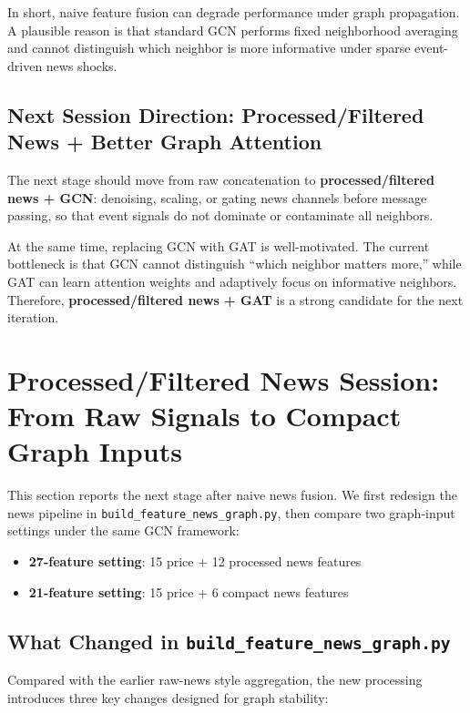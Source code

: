 In short, naive feature fusion can degrade performance under graph propagation. A plausible reason is that standard GCN performs fixed neighborhood averaging and cannot distinguish which neighbor is more informative under sparse event-driven news shocks.

\subsection{Next Session Direction: Processed/Filtered News + Better Graph Attention}

The next stage should move from raw concatenation to \textbf{processed/filtered news + GCN}: denoising, scaling, or gating news channels before message passing, so that event signals do not dominate or contaminate all neighbors.

At the same time, replacing GCN with GAT is well-motivated. The current bottleneck is that GCN cannot distinguish ``which neighbor matters more,'' while GAT can learn attention weights and adaptively focus on informative neighbors. Therefore, \textbf{processed/filtered news + GAT} is a strong candidate for the next iteration.

\section{Processed/Filtered News Session: From Raw Signals to Compact Graph Inputs}

This section reports the next stage after naive news fusion. We first redesign the news pipeline in \texttt{build\_feature\_news\_graph.py}, then compare two graph-input settings under the same GCN framework:
\begin{itemize}
\item \textbf{27-feature setting}: 15 price + 12 processed news features
\item \textbf{21-feature setting}: 15 price + 6 compact news features
\end{itemize}

\subsection{What Changed in \texttt{build\_feature\_news\_graph.py}}

Compared with the earlier raw-news style aggregation, the new processing introduces three key changes designed for graph stability:

